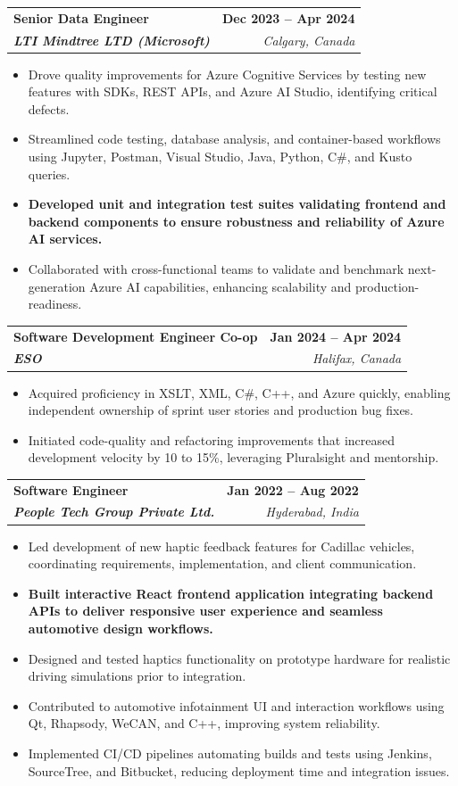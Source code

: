 \documentclass[letterpaper,11pt]{article}
\makeatletter
\newcommand{\resumeItem}[1]{
  \item\small{
    {#1 \vspace{-2pt}}
  }
}
\newcommand{\resumeSubheading}[4]{
  \vspace{-2pt}\item
    \begin{tabular*}{1.0\textwidth}[t]{l@{\extracolsep{\fill}}r}
      \textbf{#1} & \textbf{\small #2} \\
      \textit{\small#3} & \textit{\small #4} \\
    \end{tabular*}\vspace{-7pt}
}
\newcommand{\resumeItemListStart}{\begin{itemize}}
\newcommand{\resumeItemListEnd}{\end{itemize}\vspace{-5pt}}
\makeatother
\begin{document}
    \resumeSubheading
      {\textbf{Senior Data Engineer}}{\textbf{Dec 2023 -- Apr 2024}}
      {\textbf{LTI Mindtree LTD (Microsoft)}}{Calgary, Canada}
      \resumeItemListStart
        \resumeItem{Drove quality improvements for Azure Cognitive Services by testing new features with SDKs, REST APIs, and Azure AI Studio, identifying critical defects.}
        \resumeItem{Streamlined code testing, database analysis, and container-based workflows using Jupyter, Postman, Visual Studio, Java, Python, C\#, and Kusto queries.}
        \resumeItem{\textbf{Developed unit and integration test suites validating frontend and backend components to ensure robustness and reliability of Azure AI services.}}
        \resumeItem{Collaborated with cross-functional teams to validate and benchmark next-generation Azure AI capabilities, enhancing scalability and production-readiness.}
      \resumeItemListEnd
    
    \resumeSubheading
      {\textbf{Software Development Engineer Co-op}}{\textbf{Jan 2024 -- Apr 2024}}
      {\textbf{ESO}}{Halifax, Canada}
      \resumeItemListStart
        \resumeItem{Acquired proficiency in XSLT, XML, C\#, C++, and Azure quickly, enabling independent ownership of sprint user stories and production bug fixes.}
        \resumeItem{Initiated code-quality and refactoring improvements that increased development velocity by 10 to 15\%, leveraging Pluralsight and mentorship.}
      \resumeItemListEnd

    \resumeSubheading
      {\textbf{Software Engineer}}{\textbf{Jan 2022 -- Aug 2022}}
      {\textbf{People Tech Group Private Ltd.}}{Hyderabad, India}
      \resumeItemListStart
        \resumeItem{Led development of new haptic feedback features for Cadillac vehicles, coordinating requirements, implementation, and client communication.}
        \resumeItem{\textbf{Built interactive React frontend application integrating backend APIs to deliver responsive user experience and seamless automotive design workflows.}}
        \resumeItem{Designed and tested haptics functionality on prototype hardware for realistic driving simulations prior to integration.}
        \resumeItem{Contributed to automotive infotainment UI and interaction workflows using Qt, Rhapsody, WeCAN, and C++, improving system reliability.}
        \resumeItem{Implemented CI/CD pipelines automating builds and tests using Jenkins, SourceTree, and Bitbucket, reducing deployment time and integration issues.}
      \resumeItemListEnd
\end{document}
